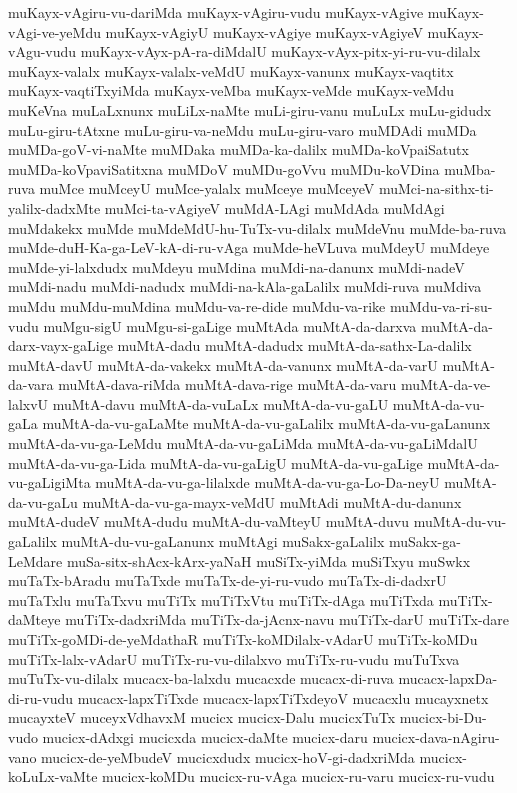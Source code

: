 {muKayx-vAgiru-vu-dariMda
muKayx-vAgiru-vudu
muKayx-vAgive
muKayx-vAgi-ve-yeMdu
muKayx-vAgiyU
muKayx-vAgiye
muKayx-vAgiyeV
muKayx-vAgu-vudu
muKayx-vAyx-pA-ra-diMdalU
muKayx-vAyx-pitx-yi-ru-vu-dilalx
muKayx-valalx
muKayx-valalx-veMdU
muKayx-vanunx
muKayx-vaqtitx
muKayx-vaqtiTxyiMda
muKayx-veMba
muKayx-veMde
muKayx-veMdu
muKeVna
muLaLxnunx
muLiLx-naMte
muLi-giru-vanu
muLuLx
muLu-gidudx
muLu-giru-tAtxne
muLu-giru-va-neMdu
muLu-giru-varo
muMDAdi
muMDa
muMDa-goV-vi-naMte
muMDaka
muMDa-ka-dalilx
muMDa-koVpaiSatutx
muMDa-koVpaviSatitxna
muMDoV
muMDu-goVvu
muMDu-koVDina
muMba-ruva
muMce
muMceyU
muMce-yalalx
muMceye
muMceyeV
muMci-na-sithx-ti-yalilx-dadxMte
muMci-ta-vAgiyeV
muMdA-LAgi
muMdAda
muMdAgi
muMdakekx
muMde
muMdeMdU-hu-TuTx-vu-dilalx
muMdeVnu
muMde-ba-ruva
muMde-duH-Ka-ga-LeV-kA-di-ru-vAga
muMde-heVLuva
muMdeyU
muMdeye
muMde-yi-lalxdudx
muMdeyu
muMdina
muMdi-na-danunx
muMdi-nadeV
muMdi-nadu
muMdi-nadudx
muMdi-na-kAla-gaLalilx
muMdi-ruva
muMdiva
muMdu
muMdu-muMdina
muMdu-va-re-dide
muMdu-va-rike
muMdu-va-ri-su-vudu
muMgu-sigU
muMgu-si-gaLige
muMtAda
muMtA-da-darxva
muMtA-da-darx-vayx-gaLige
muMtA-dadu
muMtA-dadudx
muMtA-da-sathx-La-dalilx
muMtA-davU
muMtA-da-vakekx
muMtA-da-vanunx
muMtA-da-varU
muMtA-da-vara
muMtA-dava-riMda
muMtA-dava-rige
muMtA-da-varu
muMtA-da-ve-lalxvU
muMtA-davu
muMtA-da-vuLaLx
muMtA-da-vu-gaLU
muMtA-da-vu-gaLa
muMtA-da-vu-gaLaMte
muMtA-da-vu-gaLalilx
muMtA-da-vu-gaLanunx
muMtA-da-vu-ga-LeMdu
muMtA-da-vu-gaLiMda
muMtA-da-vu-gaLiMdalU
muMtA-da-vu-ga-Lida
muMtA-da-vu-gaLigU
muMtA-da-vu-gaLige
muMtA-da-vu-gaLigiMta
muMtA-da-vu-ga-lilalxde
muMtA-da-vu-ga-Lo-Da-neyU
muMtA-da-vu-gaLu
muMtA-da-vu-ga-mayx-veMdU
muMtAdi
muMtA-du-danunx
muMtA-dudeV
muMtA-dudu
muMtA-du-vaMteyU
muMtA-duvu
muMtA-du-vu-gaLalilx
muMtA-du-vu-gaLanunx
muMtAgi
muSakx-gaLalilx
muSakx-ga-LeMdare
muSa-sitx-shAcx-kArx-yaNaH
muSiTx-yiMda
muSiTxyu
muSwkx
muTaTx-bAradu
muTaTxde
muTaTx-de-yi-ru-vudo
muTaTx-di-dadxrU
muTaTxlu
muTaTxvu
muTiTx
muTiTxVtu
muTiTx-dAga
muTiTxda
muTiTx-daMteye
muTiTx-dadxriMda
muTiTx-da-jAcnx-navu
muTiTx-darU
muTiTx-dare
muTiTx-goMDi-de-yeMdathaR
muTiTx-koMDilalx-vAdarU
muTiTx-koMDu
muTiTx-lalx-vAdarU
muTiTx-ru-vu-dilalxvo
muTiTx-ru-vudu
muTuTxva
muTuTx-vu-dilalx
mucacx-ba-lalxdu
mucacxde
mucacx-di-ruva
mucacx-lapxDa-di-ru-vudu
mucacx-lapxTiTxde
mucacx-lapxTiTxdeyoV
mucacxlu
mucayxnetx
mucayxteV
muceyxVdhavxM
mucicx
mucicx-Dalu
mucicxTuTx
mucicx-bi-Du-vudo
mucicx-dAdxgi
mucicxda
mucicx-daMte
mucicx-daru
mucicx-dava-nAgiru-vano
mucicx-de-yeMbudeV
mucicxdudx
mucicx-hoV-gi-dadxriMda
mucicx-koLuLx-vaMte
mucicx-koMDu
mucicx-ru-vAga
mucicx-ru-varu
mucicx-ru-vudu
}
